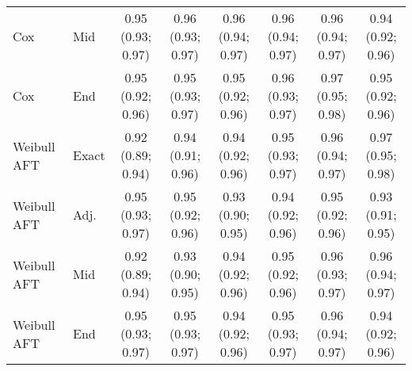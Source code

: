 \begin{table*}[htbp]
\begin{sideways}
\begin{tabular}{llcccccc}
Cox & Mid & \makecell{0.95\\(0.93; 0.97)} & \makecell{0.96\\(0.93; 0.97)} & \makecell{0.96\\(0.94; 0.97)} & \makecell{0.96\\(0.94; 0.97)} & \makecell{0.96\\(0.94; 0.97)} & \makecell{0.94\\(0.92; 0.96)} \\
Cox & End & \makecell{0.95\\(0.92; 0.96)} & \makecell{0.95\\(0.93; 0.97)} & \makecell{0.95\\(0.92; 0.96)} & \makecell{0.96\\(0.93; 0.97)} & \makecell{0.97\\(0.95; 0.98)} & \makecell{0.95\\(0.92; 0.96)} \\
\addlinespace
Weibull AFT & Exact & \makecell{0.92\\(0.89; 0.94)} & \makecell{0.94\\(0.91; 0.96)} & \makecell{0.94\\(0.92; 0.96)} & \makecell{0.95\\(0.93; 0.97)} & \makecell{0.96\\(0.94; 0.97)} & \makecell{0.97\\(0.95; 0.98)} \\
Weibull AFT & Adj. & \makecell{0.95\\(0.93; 0.97)} & \makecell{0.95\\(0.92; 0.96)} & \makecell{0.93\\(0.90; 0.95)} & \makecell{0.94\\(0.92; 0.96)} & \makecell{0.95\\(0.92; 0.96)} & \makecell{0.93\\(0.91; 0.95)} \\
Weibull AFT & Mid & \makecell{0.92\\(0.89; 0.94)} & \makecell{0.93\\(0.90; 0.95)} & \makecell{0.94\\(0.92; 0.96)} & \makecell{0.95\\(0.92; 0.96)} & \makecell{0.96\\(0.93; 0.97)} & \makecell{0.96\\(0.94; 0.97)} \\
Weibull AFT & End & \makecell{0.95\\(0.93; 0.97)} & \makecell{0.95\\(0.93; 0.97)} & \makecell{0.94\\(0.92; 0.96)} & \makecell{0.95\\(0.93; 0.97)} & \makecell{0.96\\(0.94; 0.97)} & \makecell{0.94\\(0.92; 0.96)} \\
\bottomrule
\end{tabular}
\normalsize
\end{sideways}
\end{table*}
